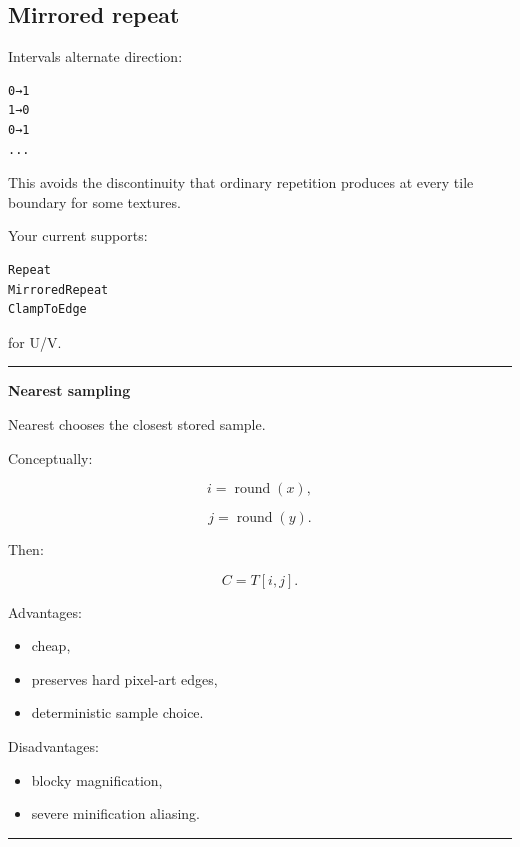 \subsection{Mirrored repeat}\label{03-visual-computing-i-ch019-mirrored-repeat}

\hypertarget{03-visual-computing-i-ch019-mirrored-repeat}{}

Intervals alternate direction:

\begin{verbatim}
0→1
1→0
0→1
...
\end{verbatim}

This avoids the discontinuity that ordinary repetition produces at every tile boundary for some textures.

Your current  supports:

\begin{verbatim}
Repeat
MirroredRepeat
ClampToEdge
\end{verbatim}

for U/V.

\begin{center}\rule{0.5\linewidth}{0.5pt}\end{center}

\textbf{Nearest sampling}

Nearest chooses the closest stored sample.

Conceptually:

\[
i=\operatorname{round}(x),
\]

\[
j=\operatorname{round}(y).
\]

Then:

\[
C=T[i,j].
\]

Advantages:

\begin{itemize}
\tightlist
\item
  cheap,
\item
  preserves hard pixel-art edges,
\item
  deterministic sample choice.
\end{itemize}

Disadvantages:

\begin{itemize}
\tightlist
\item
  blocky magnification,
\item
  severe minification aliasing.
\end{itemize}

\begin{center}\rule{0.5\linewidth}{0.5pt}\end{center}

